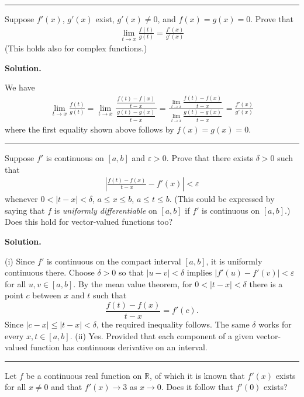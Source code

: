 \documentclass[12pt]{article}
\theoremstyle{definition}
\begin{document}
\bigskip\noindent\hrule\bigskip

Suppose $f'(x)$, $g'(x)$ exist, $g'(x)\ne 0$, and $f(x)=g(x)=0$. Prove that
\begin{align*}
\lim_{t\to x}\frac{f(t)}{g(t)}=\frac{f'(x)}{g'(x)}
\end{align*}
(This holds also for complex functions.)

\smallskip
\noindent\textbf{Solution.}\quad

We have
\begin{align*}
\lim_{t\to x}\frac{f(t)}{g(t)}
=\lim_{t\to x}\frac{\,\dfrac{f(t)-f(x)}{t-x}\,}{\,\dfrac{g(t)-g(x)}{t-x}\,} 
=\frac{\,\displaystyle\lim_{t\to x}\dfrac{f(t)-f(x)}{t-x}\,}{\,\displaystyle\lim_{t\to x}\dfrac{g(t)-g(x)}{t-x}\,} 
=\frac{f'(x)}{g'(x)}
\end{align*}
where the first equality shown above follows by $f(x)=g(x)=0$.



\bigskip\noindent\hrule\bigskip

Suppose $f'$ is continuous on $[a,b]$ and $\varepsilon>0$. Prove that there exists $\delta>0$ such that
\begin{align*}
\left\vert\frac{f(t)-f(x)}{t-x}-f'(x)\right\vert<\varepsilon
\end{align*}
whenever $0<\left\vert t-x\right\vert<\delta$, $a\le x\le b$, $a\le t\le b$. (This could be expressed by saying that $f$ is \textit{uniformly differentiable} on $[a,b]$ if $f'$ is continuous on $[a,b]$.) Does this hold for vector-valued functions too?

\smallskip
\noindent\textbf{Solution.}\quad

(i) Since $f'$ is continuous on the compact interval $[a,b]$, it is uniformly continuous there.  Choose $\delta>0$ so that $|u-v|<\delta$ implies $|f'(u)-f'(v)|<\varepsilon$ for all $u,v\in[a,b]$.  By the mean value theorem, for $0<|t-x|<\delta$ there is a point $c$ between $x$ and $t$ such that
\[
 \frac{f(t)-f(x)}{t-x}=f'(c).
\]
Since $|c-x|\le|t-x|<\delta$, the required inequality follows.  The same $\delta$ works for every $x,t\in[a,b]$.
(ii) Yes. Provided that each component of a given vector-valued function has continuous derivative on an interval.



\bigskip\noindent\hrule\bigskip

Let $f$ be a continuous real function on $\mathbb{R}$, of which it is known that $f'(x)$ exists for all $x\ne 0$ and that $f'(x)\to 3$ as $x\to 0$. Does it follow that $f'(0)$ exists?
\end{document}
